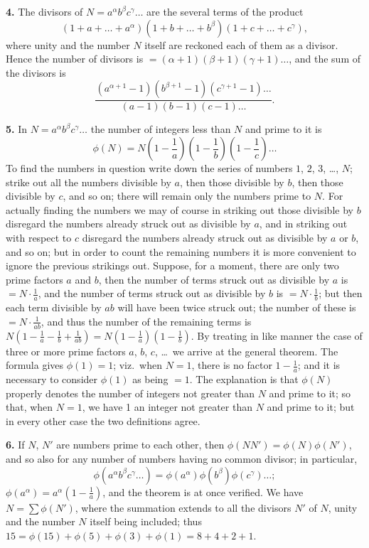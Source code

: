 \documentclass[11pt,a4paper]{article}
\begin{document}
\textbf{4.}\quad
The divisors of $N = a^{\alpha} b^{\beta} c^{\gamma} \ldots$ are the several terms of the product
\[
(1 + a + \ldots + a^{\alpha})(1 + b + \ldots + b^{\beta})(1 + c + \ldots + c^{\gamma}),
\]
where unity and the number $N$ itself are reckoned each of them as a divisor. Hence the number of divisors is $= (\alpha + 1)(\beta + 1)(\gamma + 1) \ldots$, and the sum of the divisors is
\[
\frac{(a^{\alpha+1} - 1)(b^{\beta+1} - 1)(c^{\gamma+1} - 1) \ldots}{(a - 1)(b - 1)(c - 1) \ldots}.
\]

\textbf{5.}\quad
In $N = a^{\alpha} b^{\beta} c^{\gamma} \ldots$ the number of integers less than $N$ and prime to it is
\[
\phi(N) = N\left(1 - \frac{1}{a}\right)\left(1 - \frac{1}{b}\right)\left(1 - \frac{1}{c}\right) \ldots
\]
To find the numbers in question write down the series of numbers $1$, $2$, $3$, \ldots, $N$; strike out all the numbers divisible by $a$, then those divisible by $b$, then those divisible by $c$, and so on; there will remain only the numbers prime to $N$. For actually finding the numbers we may of course in striking out those divisible by $b$ disregard the numbers already struck out as divisible by $a$, and in striking out with respect to $c$ disregard the numbers already struck out as divisible by $a$ or $b$, and so on; but in order to count the remaining numbers it is more convenient to ignore the previous strikings out. Suppose, for a moment, there are only two prime factors $a$ and $b$, then the number of terms struck out as divisible by $a$ is $= N \cdot \frac{1}{a}$, and the number of terms struck out as divisible by $b$ is $= N \cdot \frac{1}{b}$; but then each term divisible by $ab$ will have been twice struck out; the number of these is $= N \cdot \frac{1}{ab}$, and thus the number of the remaining terms is $N(1 - \frac{1}{a} - \frac{1}{b} + \frac{1}{ab}) = N(1 - \frac{1}{a})(1 - \frac{1}{b})$. By treating in like manner the case of three or more prime factors $a$, $b$, $c$, \ldots\ we arrive at the general theorem. The formula gives $\phi(1) = 1$; viz.\ when $N = 1$, there is no factor $1 - \frac{1}{a}$; and it is necessary to consider $\phi(1)$ as being $= 1$. The explanation is that $\phi(N)$ properly denotes the number of integers not greater than $N$ and prime to it; so that, when $N = 1$, we have 1 an integer not greater than $N$ and prime to it; but in every other case the two definitions agree.

\textbf{6.}\quad
If $N$, $N'$ are numbers prime to each other, then $\phi(NN') = \phi(N)\phi(N')$, and so also for any number of numbers having no common divisor; in particular,
\[
\phi(a^{\alpha} b^{\beta} c^{\gamma} \ldots) = \phi(a^{\alpha})\phi(b^{\beta})\phi(c^{\gamma}) \ldots;
\]
$\phi(a^{\alpha}) = a^{\alpha}(1 - \frac{1}{a})$, and the theorem is at once verified. We have $N = \sum \phi(N')$, where the summation extends to all the divisors $N'$ of $N$, unity and the number $N$ itself being included; thus $15 = \phi(15) + \phi(5) + \phi(3) + \phi(1) = 8 + 4 + 2 + 1$.
\end{document}
